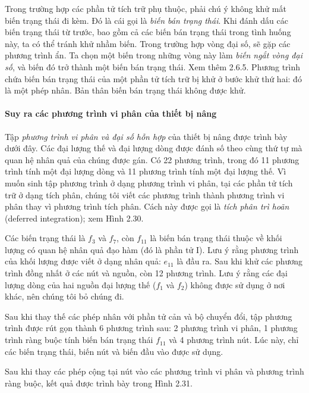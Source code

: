 Trong trường hợp các phần tử tích trữ phụ thuộc, phải chú ý không khử mất biến trạng thái đi kèm. Đó là cái gọi là \emph{biến bán trạng thái}. Khi đánh dấu các biến trạng thái từ trước, bao gồm cả các biến bán trạng thái trong tình huống này, ta có thể tránh khử nhầm biến. Trong trường hợp vòng đại số, sẽ gặp các phương trình ẩn. Ta chọn một biến trong những vòng này làm \emph{biến ngắt vòng đại số}, và biến đó trở thành một biến bán trạng thái. Xem thêm 2.6.5. Phương trình chứa biến bán trạng thái của một phần tử tích trữ bị khử ở bước khử thứ hai: đó là một phép nhân. Bản thân biến bán trạng thái không được khử.

\paragraph{Suy ra các phương trình vi phân của thiết bị nâng}
Tập \emph{phương trình vi phân và đại số hỗn hợp} của thiết bị nâng được trình bày dưới đây. Các đại lượng thế và đại lượng dòng được đánh số theo cùng thứ tự mà quan hệ nhân quả của chúng được gán. Có 22 phương trình, trong đó 11 phương trình tính một đại lượng dòng và 11 phương trình tính một đại lượng thế. Vì muốn sinh tập phương trình ở dạng phương trình vi phân, tại các phần tử tích trữ ở dạng tích phân, chúng tôi viết các phương trình thành phương trình vi phân thay vì phương trình tích phân. Cách này được gọi là \emph{tích phân trì hoãn} (deferred integration); xem Hình 2.30.

Các biến trạng thái là $f_3$ và $f_7$, còn $f_{11}$ là biến bán trạng thái thuộc về khối lượng có quan hệ nhân quả đạo hàm (đó là phần tử I). Lưu ý rằng phương trình của khối lượng được viết ở dạng nhân quả: $e_{11}$ là đầu ra. Sau khi khử các phương trình đồng nhất ở các nút và nguồn, còn 12 phương trình. Lưu ý rằng các đại lượng dòng của hai nguồn đại lượng thế ($f_1$ và $f_2$) không được sử dụng ở nơi khác, nên chúng tôi bỏ chúng đi.

Sau khi thay thế các phép nhân với phần tử cản và bộ chuyển đổi, tập phương trình được rút gọn thành 6 phương trình sau: 2 phương trình vi phân, 1 phương trình ràng buộc tính biến bán trạng thái $f_{11}$ và 4 phương trình nút. Lúc này, chỉ các biến trạng thái, biến nút và biến đầu vào được sử dụng.

Sau khi thay các phép cộng tại nút vào các phương trình vi phân và phương trình ràng buộc, kết quả được trình bày trong Hình 2.31.

